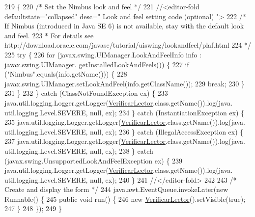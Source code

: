 \begin{DoxyCode}
219                                            \{
220         \textcolor{comment}{/* Set the Nimbus look and feel */}
221         \textcolor{comment}{//<editor-fold defaultstate="collapsed" desc=" Look and feel setting code (optional) ">}
222         \textcolor{comment}{/* If Nimbus (introduced in Java SE 6) is not available, stay with the default look and feel.}
223 \textcolor{comment}{         * For details see http://download.oracle.com/javase/tutorial/uiswing/lookandfeel/plaf.html }
224 \textcolor{comment}{         */}
225         \textcolor{keywordflow}{try} \{
226             \textcolor{keywordflow}{for} (javax.swing.UIManager.LookAndFeelInfo info : javax.swing.UIManager.
      getInstalledLookAndFeels()) \{
227                 \textcolor{keywordflow}{if} (\textcolor{stringliteral}{"Nimbus"}.equals(info.getName())) \{
228                     javax.swing.UIManager.setLookAndFeel(info.getClassName());
229                     \textcolor{keywordflow}{break};
230                 \}
231             \}
232         \} \textcolor{keywordflow}{catch} (ClassNotFoundException ex) \{
233             java.util.logging.Logger.getLogger(\mbox{\hyperlink{class_interfaz_package_1_1_verificar_lector_a417a34478f55e6f453adbbb351381962}{VerificarLector}}.class.getName()).log(java.
      util.logging.Level.SEVERE, null, ex);
234         \} \textcolor{keywordflow}{catch} (InstantiationException ex) \{
235             java.util.logging.Logger.getLogger(\mbox{\hyperlink{class_interfaz_package_1_1_verificar_lector_a417a34478f55e6f453adbbb351381962}{VerificarLector}}.class.getName()).log(java.
      util.logging.Level.SEVERE, null, ex);
236         \} \textcolor{keywordflow}{catch} (IllegalAccessException ex) \{
237             java.util.logging.Logger.getLogger(\mbox{\hyperlink{class_interfaz_package_1_1_verificar_lector_a417a34478f55e6f453adbbb351381962}{VerificarLector}}.class.getName()).log(java.
      util.logging.Level.SEVERE, null, ex);
238         \} \textcolor{keywordflow}{catch} (javax.swing.UnsupportedLookAndFeelException ex) \{
239             java.util.logging.Logger.getLogger(\mbox{\hyperlink{class_interfaz_package_1_1_verificar_lector_a417a34478f55e6f453adbbb351381962}{VerificarLector}}.class.getName()).log(java.
      util.logging.Level.SEVERE, null, ex);
240         \}
241         \textcolor{comment}{//</editor-fold>}
242 
243         \textcolor{comment}{/* Create and display the form */}
244         java.awt.EventQueue.invokeLater(\textcolor{keyword}{new} Runnable() \{
245             \textcolor{keyword}{public} \textcolor{keywordtype}{void} run() \{
246                 \textcolor{keyword}{new} \mbox{\hyperlink{class_interfaz_package_1_1_verificar_lector_a417a34478f55e6f453adbbb351381962}{VerificarLector}}().setVisible(\textcolor{keyword}{true});
247             \}
248         \});
249     \}
\end{DoxyCode}


